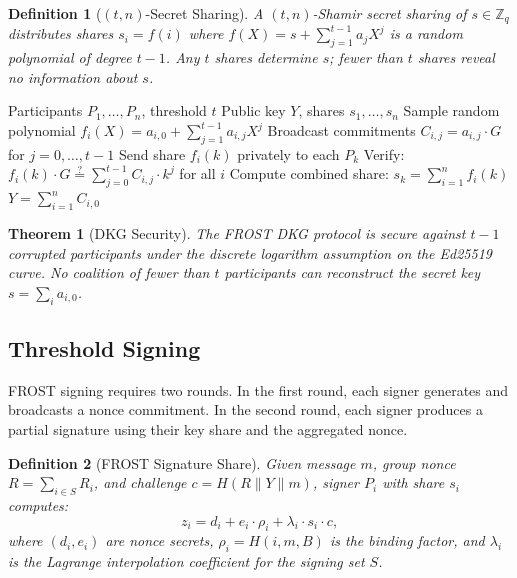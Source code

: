 \documentclass[11pt]{article}
\newtheorem{theorem}{Theorem}
\newtheorem{definition}{Definition}
\begin{document}
\begin{definition}[$(t, n)$-Secret Sharing]
A $(t, n)$-Shamir secret sharing of $s \in \mathbb{Z}_q$ distributes shares
$s_i = f(i)$ where $f(X) = s + \sum_{j=1}^{t-1} a_j X^j$ is a random
polynomial of degree $t-1$. Any $t$ shares determine $s$; fewer than $t$
shares reveal no information about $s$.
\end{definition}

\begin{algorithm}
\caption{FROST Distributed Key Generation}
\label{alg:dkg}
\begin{algorithmic}[1]
\Require Participants $P_1, \ldots, P_n$, threshold $t$
\Ensure Public key $Y$, shares $s_1, \ldots, s_n$
    \State Sample random polynomial $f_i(X) = a_{i,0} + \sum_{j=1}^{t-1} a_{i,j} X^j$
    \State Broadcast commitments $C_{i,j} = a_{i,j} \cdot G$ for $j = 0, \ldots, t-1$
    \State Send share $f_i(k)$ privately to each $P_k$
\EndFor
{}
    \State Verify: $f_i(k) \cdot G \stackrel{?}{=} \sum_{j=0}^{t-1} C_{i,j} \cdot k^j$ for all $i$
    \State Compute combined share: $s_k = \sum_{i=1}^{n} f_i(k)$
\EndFor
\State $Y = \sum_{i=1}^{n} C_{i,0}$ 
\end{algorithmic}
\end{algorithm}

\begin{theorem}[DKG Security]
The FROST DKG protocol is secure against $t-1$ corrupted participants under
the discrete logarithm assumption on the Ed25519 curve. No coalition of fewer
than $t$ participants can reconstruct the secret key $s = \sum_i a_{i,0}$.
\end{theorem}

\subsection{Threshold Signing}

FROST signing requires two rounds. In the first round, each signer generates
and broadcasts a nonce commitment. In the second round, each signer produces a
partial signature using their key share and the aggregated nonce.

\begin{definition}[FROST Signature Share]
Given message $m$, group nonce $R = \sum_{i \in S} R_i$, and challenge
$c = H(R \| Y \| m)$, signer $P_i$ with share $s_i$ computes:
\begin{equation}
z_i = d_i + e_i \cdot \rho_i + \lambda_i \cdot s_i \cdot c,
\end{equation}
where $(d_i, e_i)$ are nonce secrets, $\rho_i = H(i, m, B)$ is the binding
factor, and $\lambda_i$ is the Lagrange interpolation coefficient for the
signing set $S$.
\end{definition}
\end{document}
